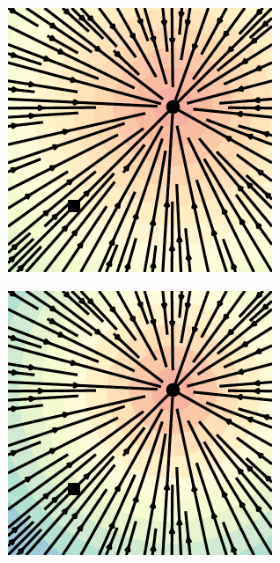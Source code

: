 \documentclass{article}
\begin{document}
\begin{figure}
\begin{subfigure}[t]{0.43\linewidth}
\begin{subfigure}[t]{0.23\linewidth}
        \includegraphics[width=\linewidth]{figures/plots/2d_vf_flow_match_ot_0.pdf}
        \vspace{-1.5em}
        \caption*{}
    \end{subfigure}
    \begin{subfigure}[t]{0.23\linewidth}
        \centering
        \includegraphics[width=\linewidth]{figures/plots/2d_vf_flow_match_ot_1.pdf}

\end{subfigure}
\end{subfigure}
\end{figure}
\end{document}
